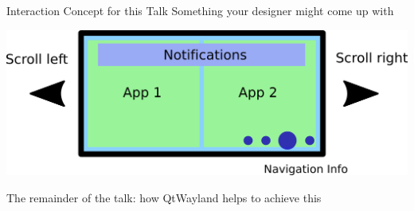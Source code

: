 \documentclass[ucs,9pt]{beamer}
\begin{document}
\begin{frame}
    {Interaction Concept for this Talk}
    {Something your designer might come up with}

    \begin{center}
        \includegraphics[width=.8\paperwidth]{interactionconcept.png}
    \end{center}
    \bigskip

    The remainder of the talk: how QtWayland helps to achieve this
\end{frame}
\end{document}
